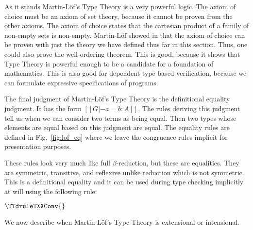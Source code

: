 As it stands Martin-L\"of's Type Theory is a very powerful logic.  The
axiom of choice must be an axiom of set theory, because it cannot be
proven from the other axioms.  The axiom of choice states that the
cartesian product of a family of non-empty sets is non-empty.
Martin-L\"of showed in \cite{Martin:1984} that the axiom of choice can
be proven with just the theory we have defined thus far in this
section.  Thus, one could also prove the well-ordering theorem.  This
is good, because it shows that Type Theory is powerful enough to be a
candidate for a foundation of mathematics.  This is also good for
dependent type based verification, because we can formulate expressive
specifications of programs.

The final judgment of Martin-L\"of's Type Theory is the definitional
equality judgment. It has the form $[[G |- a = b : A]]$. The rules
deriving this judgment tell us when we can consider two terms as being
equal.  Then two types whose elements are equal based on this judgment
are equal.  The equality rules are defined in Fig.~\ref{fig:lof_eq} where
we leave the congruence rules implicit for presentation purposes.

These rules look very much like full $\beta$-reduction, but these are
equalities.  They are symmetric, transitive, and reflexive unlike
reduction which is not symmetric.  This is a definitional equality and
it can be used during type checking implicitly at will using the following rule:
\begin{center}
  \begin{math}
    \TTdruleTXXConv{}
  \end{math}
\end{center}
We now describe when Martin-L\"of's Type Theory is extensional or
intensional.

